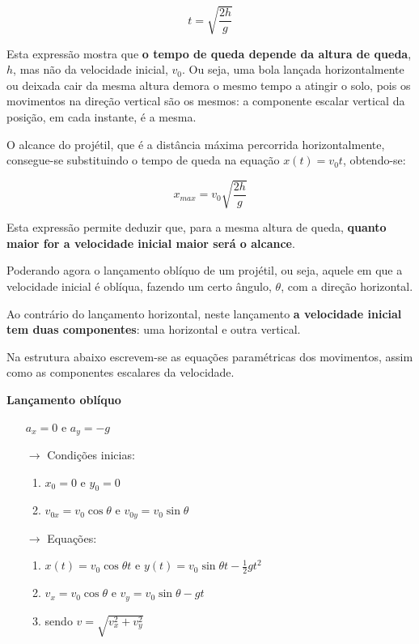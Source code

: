 \documentclass[a4paper,11pt,oneside]{report}
\begin{document}
\[
t = \sqrt{\frac{2h}{g}}
\]

Esta expressão mostra que \textbf{o tempo de queda depende da altura de queda}, $h$, 
mas não da velocidade inicial, $v_0$. Ou seja, uma bola lançada horizontalmente 
ou deixada cair da mesma altura demora o mesmo tempo a atingir o solo, pois os 
movimentos na direção vertical são os mesmos: a componente escalar vertical da 
posição, em cada instante, é a mesma.

O alcance do projétil, que é a distância máxima percorrida horizontalmente, 
consegue-se substituindo o tempo de queda na equação $x(t)=v_0t$, obtendo-se:

\[
x_{max} = v_0\sqrt{\frac{2h}{g}}
\]

Esta expressão permite deduzir que, para a mesma altura de queda, \textbf{quanto 
maior for a velocidade inicial maior será o alcance}.

Poderando agora o lançamento oblíquo de um projétil, ou seja, aquele em que 
a velocidade inicial é oblíqua, fazendo um certo ângulo, $\theta$, com a direção horizontal.

Ao contrário do lançamento horizontal, neste lançamento \textbf{a velocidade inicial 
tem duas componentes}: uma horizontal e outra vertical.

Na estrutura abaixo escrevem-se as equações paramétricas dos movimentos,
assim como as componentes escalares da velocidade.

\hrulefill
\begin{center}
    \textbf{Lançamento oblíquo}
\end{center}
\begin{itemize}\label{}
\centering
    \item[] $a_x = 0$ e $a_y = -g$
    \item[$\rightarrow$] Condições inicias:
    \begin{enumerate}
        \item $x_0 = 0$ e $y_0 = 0$
        \item $v_{0x} = v_0 \cos \theta$ e $v_{0y} = v_0 \sin \theta$
    \end{enumerate}
    \item[$\rightarrow$] Equações:
    \begin{enumerate}
        \item $x(t) = v_0 \cos \theta t $ e $y(t) = v_0 \sin \theta t - \frac{1}{2} g t^2$
        \item $v_x = v_0 \cos \theta$ e $v_y  = v_0 \sin \theta -g t$
        \item sendo $v = \sqrt{v_{x}^{2} + v_{y}^{2}}$
    \end{enumerate}
\end{itemize}
\hrulefill
\end{document}
